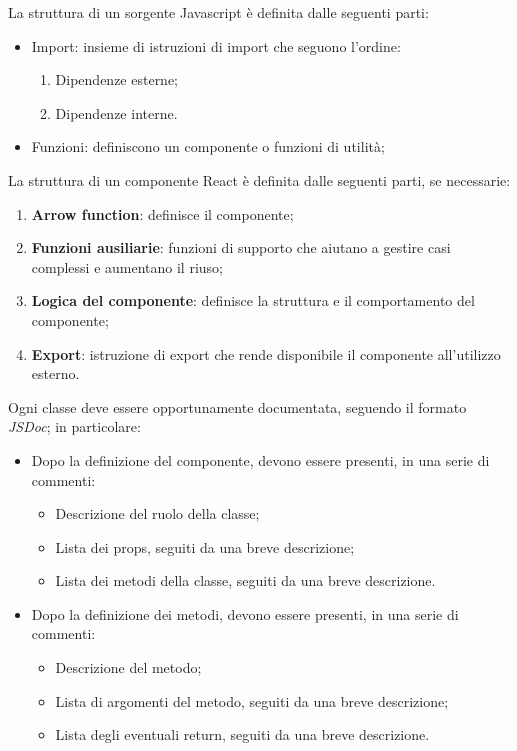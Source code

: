 \documentclass[10pt, a4paper]{article}
\begin{document}
 La struttura di un sorgente Javascript è definita dalle seguenti parti:
\begin{itemize}
    \item Import: insieme di istruzioni di import che seguono l'ordine:
    \begin{enumerate}
        \item Dipendenze esterne;
        \item Dipendenze interne.
    \end{enumerate}
    \item Funzioni: definiscono un componente o funzioni di utilità;
\end{itemize}
 La struttura di un componente React è definita dalle seguenti parti, se necessarie:
\begin{enumerate}
    \item \textbf{Arrow function}: definisce il componente;
    \item \textbf{Funzioni ausiliarie}: funzioni di supporto che aiutano a gestire casi complessi e aumentano il riuso;
    \item \textbf{Logica del componente}: definisce la struttura e il comportamento del componente;
    \item \textbf{Export}: istruzione di export che rende disponibile il componente all'utilizzo esterno.
\end{enumerate}
Ogni classe deve essere opportunamente documentata, seguendo il formato \textit{JSDoc}; in particolare:
\begin{itemize}
    \item Dopo la definizione del componente, devono essere presenti, in una serie di commenti:
    \begin{itemize}
        \item Descrizione del ruolo della classe;
        \item Lista dei props, seguiti da una breve descrizione;
        \item Lista dei metodi della classe, seguiti da una breve descrizione.
    \end{itemize}
    \item Dopo la definizione dei metodi, devono essere presenti, in una serie di commenti:
    \begin{itemize}
        \item Descrizione del metodo;
        \item Lista di argomenti del metodo, seguiti da una breve descrizione;
        \item Lista degli eventuali return, seguiti da una breve descrizione.
    \end{itemize}
\end{itemize}
\end{document}
